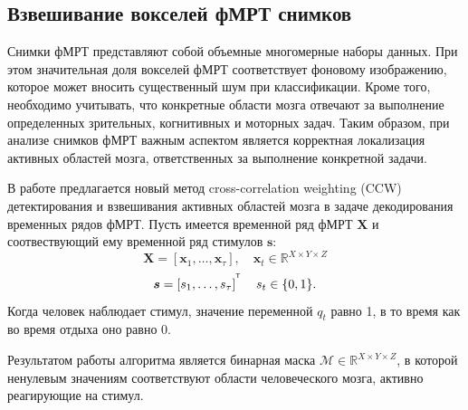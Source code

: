 \documentclass[a4paper, 12pt]{extarticle}
\begin{document}
\subsection{Взвешивание вокселей фМРТ снимков}
Снимки фМРТ представляют собой объемные многомерные наборы данных. 
При этом значительная доля вокселей фМРТ соответствует фоновому изображению, которое может вносить существенный шум при классификации. 
Кроме того, необходимо учитывать, что конкретные области мозга отвечают за выполнение определенных зрительных, когнитивных и моторных задач. 
Таким образом, при анализе снимков фМРТ важным аспектом является корректная локализация активных областей мозга, ответственных за выполнение конкретной задачи.

В работе предлагается новый метод cross-correlation weighting (CCW) детектирования и взвешивания активных областей мозга в задаче декодирования временных рядов фМРТ. 
Пусть имеется временной ряд фМРТ $\bm{X}$ и соотвествующий ему временной ряд стимулов $\bm{s}$:
\begin{equation*}
	\bm{X} = \left[\bm{x}_1, \dots, \bm{x}_{\tau}\right],\quad \bm{x}_{t} \in \mathbb{R}^{X \times Y \times Z}
\end{equation*}
\begin{equation*}
	\bm{s} = \left[s_1, \dots, s_{\tau}\right]^{^{\mathsf{T}}}\quad s_t \in \{0, 1\}.
\end{equation*}
Когда человек наблюдает стимул, значение переменной $q_t$ равно 1, в то время как во время отдыха оно равно 0. 

Результатом работы алгоритма является бинарная маска $\mathcal{M} \in  \mathbb{R}^{X \times Y \times Z}$, в которой ненулевым значениям соответствуют области человеческого мозга, активно реагирующие на стимул.
\end{document}
